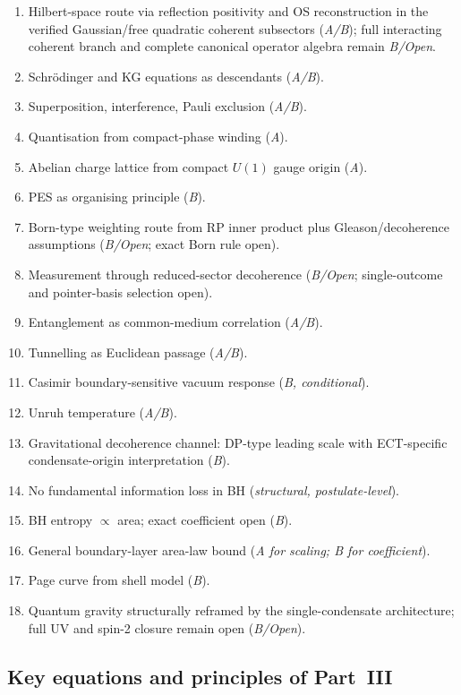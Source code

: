 \documentclass[11pt,a4paper]{article}
\begin{document}
\begin{enumerate}
\item Hilbert-space route via reflection positivity and OS reconstruction in the verified Gaussian/free quadratic coherent subsectors (\emph{A/B}); full interacting coherent branch and complete canonical operator algebra remain \emph{B/Open}.
\item Schr\"odinger and KG equations as descendants (\emph{A/B}).
\item Superposition, interference, Pauli exclusion (\emph{A/B}).
\item Quantisation from compact-phase winding (\emph{A}).
\item Abelian charge lattice from compact $U(1)$ gauge origin (\emph{A}).
\item PES as organising principle (\emph{B}).
\item Born-type weighting route from RP inner product plus Gleason/decoherence assumptions (\emph{B/Open}; exact Born rule open).
\item Measurement through reduced-sector decoherence (\emph{B/Open}; single-outcome and pointer-basis selection open).
\item Entanglement as common-medium correlation (\emph{A/B}).
\item Tunnelling as Euclidean passage (\emph{A/B}).
\item Casimir boundary-sensitive vacuum response (\emph{B, conditional}).
\item Unruh temperature (\emph{A/B}).
\item Gravitational decoherence channel: DP-type leading scale with ECT-specific condensate-origin interpretation (\emph{B}).
\item No fundamental information loss in BH (\emph{structural, postulate-level}).
\item BH entropy $\propto$ area; exact coefficient open (\emph{B}).
\item General boundary-layer area-law bound (\emph{A for scaling; B for coefficient}).
\item Page curve from shell model (\emph{B}).
\item Quantum gravity structurally reframed by the single-condensate architecture; full UV and spin-2 closure remain open (\emph{B/Open}).
\end{enumerate}

\subsection{Key equations and principles of Part~III}
\end{document}
